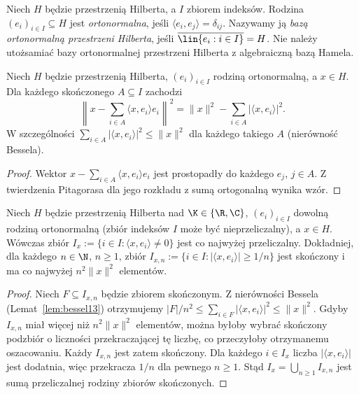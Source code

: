 \begin{definicja}
\label{def:on-basis13}
Niech $H$ będzie przestrzenią Hilberta, a $I$ zbiorem indeksów.
Rodzina $(e_i)_{i\in I}\subseteq H$ jest \emph{ortonormalna}, jeśli
$\langle e_i,e_j\rangle=\delta_{ij}$.
Nazywamy ją \emph{bazą ortonormalną przestrzeni Hilberta}, jeśli
$\overline{\lin\{e_i:i\in I\}}=H$.
Nie należy utożsamiać bazy ortonormalnej przestrzeni Hilberta z algebraiczną bazą Hamela.
\end{definicja}

\begin{lemat}
\label{lem:bessel13}
Niech $H$ będzie przestrzenią Hilberta, $(e_i)_{i\in I}$ rodziną
ortonormalną, a $x\in H$. Dla każdego skończonego $A\subseteq I$
zachodzi
\[
\left\|x-\sum_{i\in A}\langle x,e_i\rangle e_i\right\|^2
=\|x\|^2-\sum_{i\in A}|\langle x,e_i\rangle|^2.
\]
W szczególności $\sum_{i\in A}|\langle x,e_i\rangle|^2\le\|x\|^2$
dla każdego takiego $A$ (nierówność Bessela).
\end{lemat}
\begin{proof}
Wektor $x-\sum_{i\in A}\langle x,e_i\rangle e_i$ jest
prostopadły do każdego $e_j$, $j\in A$. Z twierdzenia Pitagorasa
dla jego rozkładu z sumą ortogonalną wynika wzór.
\end{proof}


\begin{twierdzenie}
\label{thm:countable-fourier-support13}
Niech $H$ będzie przestrzenią Hilberta nad $\K\in\{\R,\C\}$,
$(e_i)_{i\in I}$ dowolną rodziną ortonormalną (zbiór indeksów $I$
może być nieprzeliczalny), a $x\in H$. Wówczas zbiór
$ I_x:=\{i\in I:\langle x,e_i\rangle\ne0\}$
jest co najwyżej przeliczalny. Dokładniej, dla każdego $n\in\N$,
$n\ge1$, zbiór
$ I_{x,n}:=\{i\in I:|\langle x,e_i\rangle|\ge1/n\}$
jest skończony i ma co najwyżej $n^2\|x\|^2$ elementów.
\end{twierdzenie}
\begin{proof}
Niech $F\subseteq I_{x,n}$ będzie zbiorem skończonym.
Z nierówności Bessela (Lemat~\ref{lem:bessel13}) otrzymujemy
$|F|/n^2\le\sum_{i\in F}|\langle x,e_i\rangle|^2\le\|x\|^2$.
Gdyby $I_{x,n}$ miał więcej niż $n^2\|x\|^2$ elementów,
można byłoby wybrać skończony podzbiór o liczności
przekraczającej tę liczbę, co przeczyłoby otrzymanemu oszacowaniu.
Każdy $I_{x,n}$ jest zatem skończony. Dla każdego
$i\in I_x$ liczba $|\langle x,e_i\rangle|$ jest dodatnia, więc
przekracza $1/n$ dla pewnego $n\ge1$. Stąd
$I_x=\bigcup_{n\ge1}I_{x,n}$ jest sumą przeliczalnej rodziny
zbiorów skończonych.
\end{proof}


